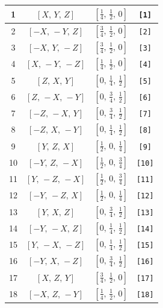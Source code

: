 \documentclass[fleqn,8pt]{jsarticle}
\begin{document}
\begin{longtable}{cccc}
1 & $\left[ X,\, Y,\, Z \right]$ & $\left[ \frac{1}{4},\, \frac{1}{2},\, 0 \right]$ & {\tt [1]} \\ \hline
2 & $\left[ - X,\, - Y,\, Z \right]$ & $\left[ \frac{3}{4},\, \frac{1}{2},\, 0 \right]$ & {\tt [2]} \\ \hline
3 & $\left[ - X,\, Y,\, - Z \right]$ & $\left[ \frac{3}{4},\, \frac{1}{2},\, 0 \right]$ & {\tt [3]} \\ \hline
4 & $\left[ X,\, - Y,\, - Z \right]$ & $\left[ \frac{1}{4},\, \frac{1}{2},\, 0 \right]$ & {\tt [4]} \\ \hline
5 & $\left[ Z,\, X,\, Y \right]$ & $\left[ 0,\, \frac{1}{4},\, \frac{1}{2} \right]$ & {\tt [5]} \\ \hline
6 & $\left[ Z,\, - X,\, - Y \right]$ & $\left[ 0,\, \frac{3}{4},\, \frac{1}{2} \right]$ & {\tt [6]} \\ \hline
7 & $\left[ - Z,\, - X,\, Y \right]$ & $\left[ 0,\, \frac{3}{4},\, \frac{1}{2} \right]$ & {\tt [7]} \\ \hline
8 & $\left[ - Z,\, X,\, - Y \right]$ & $\left[ 0,\, \frac{1}{4},\, \frac{1}{2} \right]$ & {\tt [8]} \\ \hline
9 & $\left[ Y,\, Z,\, X \right]$ & $\left[ \frac{1}{2},\, 0,\, \frac{1}{4} \right]$ & {\tt [9]} \\ \hline
10 & $\left[ - Y,\, Z,\, - X \right]$ & $\left[ \frac{1}{2},\, 0,\, \frac{3}{4} \right]$ & {\tt [10]} \\ \hline
11 & $\left[ Y,\, - Z,\, - X \right]$ & $\left[ \frac{1}{2},\, 0,\, \frac{3}{4} \right]$ & {\tt [11]} \\ \hline
12 & $\left[ - Y,\, - Z,\, X \right]$ & $\left[ \frac{1}{2},\, 0,\, \frac{1}{4} \right]$ & {\tt [12]} \\ \hline
13 & $\left[ Y,\, X,\, Z \right]$ & $\left[ 0,\, \frac{3}{4},\, \frac{1}{2} \right]$ & {\tt [13]} \\ \hline
14 & $\left[ - Y,\, - X,\, Z \right]$ & $\left[ 0,\, \frac{1}{4},\, \frac{1}{2} \right]$ & {\tt [14]} \\ \hline
15 & $\left[ Y,\, - X,\, - Z \right]$ & $\left[ 0,\, \frac{1}{4},\, \frac{1}{2} \right]$ & {\tt [15]} \\ \hline
16 & $\left[ - Y,\, X,\, - Z \right]$ & $\left[ 0,\, \frac{3}{4},\, \frac{1}{2} \right]$ & {\tt [16]} \\ \hline
17 & $\left[ X,\, Z,\, Y \right]$ & $\left[ \frac{3}{4},\, \frac{1}{2},\, 0 \right]$ & {\tt [17]} \\ \hline
18 & $\left[ - X,\, Z,\, - Y \right]$ & $\left[ \frac{1}{4},\, \frac{1}{2},\, 0 \right]$ & {\tt [18]} \\ \hline

\end{longtable}
\end{document}
